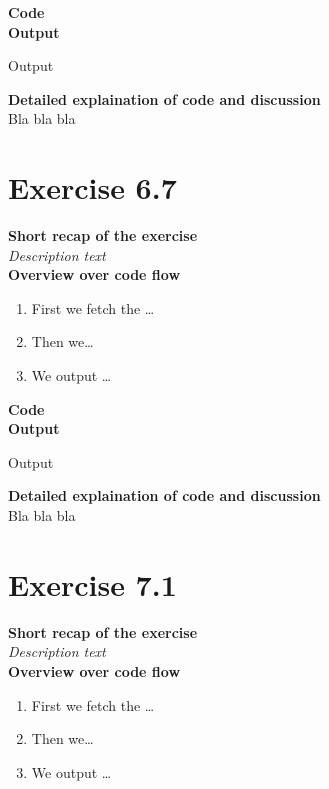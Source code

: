 \documentclass{article}
\newcommand\pythonstyle{\lstset{
language=python,
breaklines=true,
basicstyle=\ttfamily\small,
otherkeywords={1, 2, 3, 4, 5, 6, 7, 8 ,9 , 0, -, =, +, [, ], (, ), \{, \}, :, *, !},             %
keywordstyle=\color{blue},
emph={class, pass, in, for, while, if, is, elif, else, not, and, or, OR
    def, print, exec, break, continue, return},
emphstyle=\color{black}\bfseries,
emph={[2]True, False, None, self},
emphstyle=[2]\color{purple},
emph={[3]from, import, as},
emphstyle=[3]\color{blue},
stringstyle=\color{red},
frame=tb,
showstringspaces=false,
morecomment=[s]{"""}{"""},
commentstyle=\color{gray},
rulesepcolor=\color{blue},
title=\lstname
}}
\newcommand\pythonexternal[2][]{{
\pythonstyle
}}
\begin{document}
\textbf{Code}\\
\textbf{Output}
\begin{pythonOutput}
Output
\end{pythonOutput}
\textbf{Detailed explaination of code and discussion}\\
Bla bla bla
\section{Exercise 6.7}
\textbf{Short recap of the exercise}\\
\textit{Description text}\\

\textbf{Overview over code flow}\\

\begin{enumerate}
  \item First we fetch the \ldots
  \item Then we\ldots
  \item We output \ldots\\
\end{enumerate}

\textbf{Code}\\
\textbf{Output}
\begin{pythonOutput}
Output
\end{pythonOutput}
\textbf{Detailed explaination of code and discussion}\\
Bla bla bla


\section{Exercise 7.1}
\textbf{Short recap of the exercise}\\
\textit{Description text}\\

\textbf{Overview over code flow}\\

\begin{enumerate}
  \item First we fetch the \ldots
  \item Then we\ldots
  \item We output \ldots\\
\end{enumerate}
\end{document}
